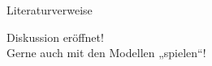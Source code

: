 \documentclass{beamer}
\begin{document}

\begin{frame}[t,allowframebreaks]{Literaturverweise}
  \nocite{Reuter20}
  \printbibliography
\end{frame}

\begin{frame}[t]
  \begin{center}
    \Huge{Diskussion eröffnet!}\\
    \vspace{1cm}
    \large{Gerne auch mit den Modellen „spielen“!}
  \end{center}
\end{frame}

\end{document}
